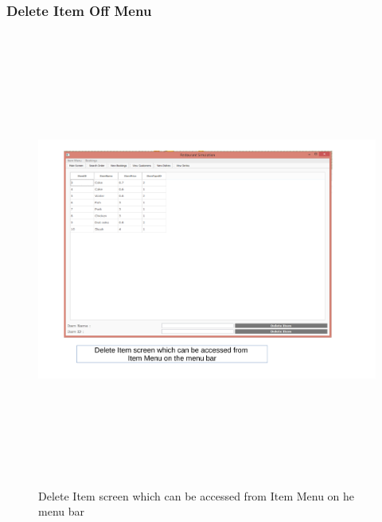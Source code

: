 \begin{landscape}
\subsubsection{Delete Item Off Menu}
\begin{figure}[H]
    \includegraphics[height = 15cm]{./Maintenance/images/screen6}
    \caption{Delete Item screen which can be accessed from Item Menu on he menu bar} \label{fig:screen6}
\end{figure}


\end{landscape}
